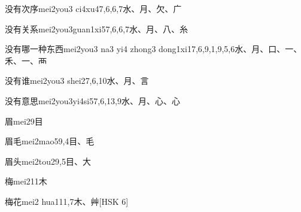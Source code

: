 \begin{EntryWithPhonetic}{没有次序}{mei2you3 ci4xu4}{7,6,6,7}{⽔、⽉、⽋、⼴}
\end{EntryWithPhonetic}

\begin{EntryWithPhonetic}{没有关系}{mei2you3guan1xi5}{7,6,6,7}{⽔、⽉、⼋、⽷}
\end{EntryWithPhonetic}

\begin{EntryWithPhonetic}{没有哪一种东西}{mei2you3 na3 yi4 zhong3 dong1xi1}{7,6,9,1,9,5,6}{⽔、⽉、⼝、⼀、⽲、⼀、⾑}
\end{EntryWithPhonetic}

\begin{EntryWithPhonetic}{没有谁}{mei2you3 shei2}{7,6,10}{⽔、⽉、⾔}
\end{EntryWithPhonetic}

\begin{EntryWithPhonetic}{没有意思}{mei2you3yi4si5}{7,6,13,9}{⽔、⽉、⼼、⼼}
\end{EntryWithPhonetic}

\begin{EntryWithPhonetic}{眉}{mei2}{9}{⽬}
\end{EntryWithPhonetic}

\begin{EntryWithPhonetic}{眉毛}{mei2mao5}{9,4}{⽬、⽑}
\end{EntryWithPhonetic}

\begin{EntryWithPhonetic}{眉头}{mei2tou2}{9,5}{⽬、⼤}
\end{EntryWithPhonetic}

\begin{EntryWithPhonetic}{梅}{mei2}{11}{⽊}
\end{EntryWithPhonetic}

\begin{EntryWithPhonetic}{梅花}{mei2 hua1}{11,7}{⽊、⾋}[HSK 6]
\end{EntryWithPhonetic}

